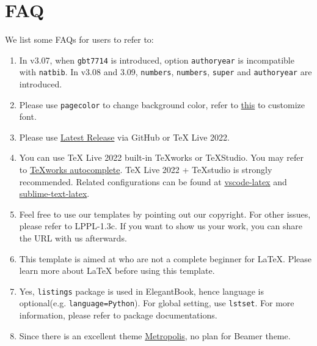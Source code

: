 \documentclass[11pt,bibtex]{elegantbook}
\begin{document}
\chapter{FAQ}
We list some FAQs for users to refer to:
\begin{enumerate}
  \item {}
  In v3.07, when \lstinline{gbt7714} is introduced, option \lstinline{authoryear} is incompatible with \lstinline{natbib}. In v3.08 and 3.09, \lstinline{numbers}, \lstinline{numbers}, \lstinline{super} and \lstinline{authoryear} are introduced.
  \item {}
  Please use \lstinline{pagecolor} to change background color, refer to \href{https://tex.stackexchange.com/questions/278544/xcolor-what-is-the-equivalent-of-default-text-color}{this} to customize font.
  \item {}
  Please use \href{https://github.com/ElegantLaTeX/ElegantBook/releases}{Latest Release} via GitHub or \TeX{} Live 2022.
  \item {}
  You can use \TeX{} Live 2022 built-in \TeX works or \TeX Studio. You may refer to \href{https://github.com/EthanDeng/texworks-autocomplete}{\TeX{}works autocomplete}. \TeX{} Live 2022 + \TeX{}studio is strongly recommended. Related configurations can be found at \href{https://github.com/EthanDeng/vscode-latex}{vscode-latex} and \href{https://github.com/EthanDeng/sublime-text-latex}{sublime-text-latex}.
  \item {}
  Feel free to use our templates by pointing out our copyright. For other issues, please refer to LPPL-1.3c. If you want to show us your work, you can share the URL with us afterwards.
  \item {}
  This template is aimed at who are not a complete beginner for \LaTeX{}. Please learn more about \LaTeX{} before using this template.
  \item {}
  Yes, \lstinline{listings} package is used in ElegantBook, hence language is optional(e.g. \lstinline{language=Python}). For global setting, use \lstinline{lstset}. For more information, please refer to package documentations.
  \item {}
  Since there is an excellent theme \href{https://github.com/matze/mtheme}{Metropolis}, no plan for Beamer theme.
\end{enumerate}
\end{document}
